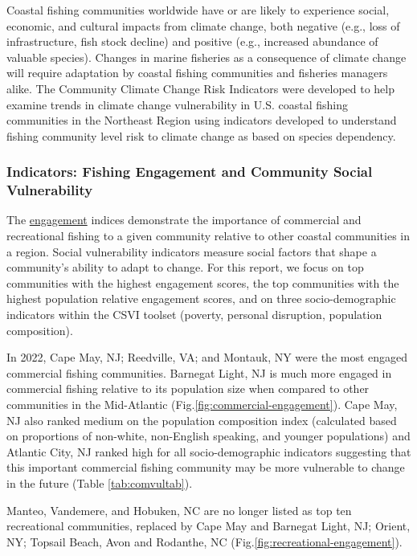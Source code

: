 \documentclass[
  10pt,
]{article}
\begin{document}
Coastal fishing communities worldwide have or are likely to experience social, economic, and cultural impacts from climate change, both negative (e.g., loss of infrastructure, fish stock decline) and positive (e.g., increased abundance of valuable species). Changes in marine fisheries as a consequence of climate change will require adaptation by coastal fishing communities and fisheries managers alike. The Community Climate Change Risk Indicators were developed to help examine trends in climate change vulnerability in U.S. coastal fishing communities in the Northeast Region using indicators developed to understand fishing community level risk to climate change as based on species dependency.

\subsubsection{Indicators: Fishing Engagement and Community Social Vulnerability}\label{indicators-fishing-engagement-and-community-social-vulnerability}

The \href{https://noaa-edab.github.io/catalog/engagement.html}{engagement} indices demonstrate the importance of commercial and recreational fishing to a given community relative to other coastal communities in a region. Social vulnerability indicators measure social factors that shape a community's ability to adapt to change. For this report, we focus on top communities with the highest engagement scores, the top communities with the highest population relative engagement scores, and on three socio-demographic indicators within the CSVI toolset (poverty, personal disruption, population composition).

In 2022, Cape May, NJ; Reedville, VA; and Montauk, NY were the most engaged commercial fishing communities. Barnegat Light, NJ is much more engaged in commercial fishing relative to its population size when compared to other communities in the Mid-Atlantic (Fig.\ref{fig:commercial-engagement}). Cape May, NJ also ranked medium on the population composition index (calculated based on proportions of non-white, non-English speaking, and younger populations) and Atlantic City, NJ ranked high for all socio-demographic indicators suggesting that this important commercial fishing community may be more vulnerable to change in the future (Table \ref{tab:comvultab}).

Manteo, Vandemere, and Hobuken, NC are no longer listed as top ten recreational communities, replaced by Cape May and Barnegat Light, NJ; Orient, NY; Topsail Beach, Avon and Rodanthe, NC (Fig.\ref{fig:recreational-engagement}).
\end{document}
